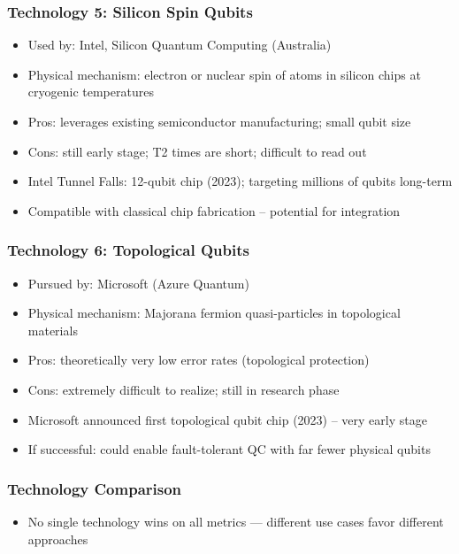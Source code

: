 \begin{frame}[fragile]\frametitle{Technology 5: Silicon Spin Qubits}
\begin{itemize}
\item Used by: Intel, Silicon Quantum Computing (Australia)
\item Physical mechanism: electron or nuclear spin of atoms in silicon chips at cryogenic temperatures
\item Pros: leverages existing semiconductor manufacturing; small qubit size
\item Cons: still early stage; T2 times are short; difficult to read out
\item Intel Tunnel Falls: 12-qubit chip (2023); targeting millions of qubits long-term
\item Compatible with classical chip fabrication -- potential for integration
\end{itemize}
\end{frame}

\begin{frame}[fragile]\frametitle{Technology 6: Topological Qubits}
\begin{itemize}
\item Pursued by: Microsoft (Azure Quantum)
\item Physical mechanism: Majorana fermion quasi-particles in topological materials
\item Pros: theoretically very low error rates (topological protection)
\item Cons: extremely difficult to realize; still in research phase
\item Microsoft announced first topological qubit chip (2023) -- very early stage
\item If successful: could enable fault-tolerant QC with far fewer physical qubits
\end{itemize}
\end{frame}

\begin{frame}[fragile]\frametitle{Technology Comparison}
\begin{itemize}
\item No single technology wins on all metrics --- different use cases favor different approaches
\end{itemize}
\begin{center}
\end{center}
\end{frame}

